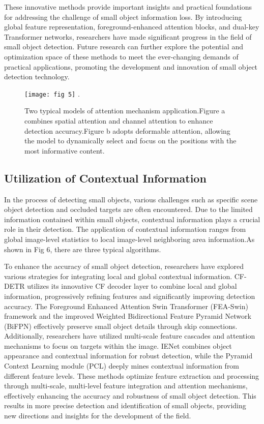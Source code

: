 \documentclass[journal]{IEEEtran}
\begin{document}
These innovative methods provide important insights and practical foundations for addressing the challenge of small object information loss. By introducing global feature representation, foreground-enhanced attention blocks, and dual-key Transformer networks, researchers have made significant progress in the field of small object detection. Future research can further explore the potential and optimization space of these methods to meet the ever-changing demands of practical applications, promoting the development and innovation of small object detection technology.

\begin{figure}[htbp]
	\centering
	\setlength{\abovecaptionskip}{-0.6cm}
	\texttt{[image: fig 5]}
	\DeclareGraphicsExtensions.
	\caption{Two typical models of attention mechanism application.Figure a combines spatial attention and channel attention to enhance detection accuracy.Figure b adopts deformable attention, allowing the model to dynamically select and focus on the positions with the most informative content.}
	\label{fig 1}
\end{figure}

\subsection{Utilization of Contextual Information}

In the process of detecting small objects, various challenges such as specific scene object detection and occluded targets are often encountered. Due to the limited information contained within small objects, contextual information plays a crucial role in their detection. The application of contextual information ranges from global image-level statistics to local image-level neighboring area information.As shown in Fig 6, there are three typical algorithms.

To enhance the accuracy of small object detection, researchers have explored various strategies for integrating local and global contextual information. CF-DETR\cite{cao2022cf} utilizes its innovative CF decoder layer to combine local and global information, progressively refining features and significantly improving detection accuracy. The Foreground Enhanced Attention Swin Transformer (FEA-Swin) framework and the improved Weighted Bidirectional Feature Pyramid Network (BiFPN) effectively preserve small object details through skip connections. Additionally, researchers have utilized multi-scale feature cascades and attention mechanisms to focus on targets within the image\cite{zeng2022nlfftnet}. IENet\cite{lin2019ienet} combines object appearance and contextual information for robust detection, while the Pyramid Context Learning module (PCL) deeply mines contextual information from different feature levels\cite{zhang2022dino}. These methods optimize feature extraction and processing through multi-scale, multi-level feature integration and attention mechanisms, effectively enhancing the accuracy and robustness of small object detection. This results in more precise detection and identification of small objects, providing new directions and insights for the development of the field.
\end{document}
